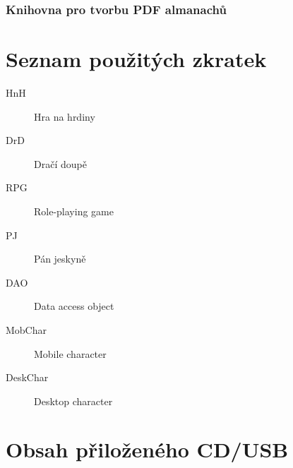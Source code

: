 \documentclass[thesis=B,czech]{resources/FITthesis}[2012/06/26]
\begin{document}
\subsection{Knihovna pro tvorbu PDF almanachů}

\begin{conclusion}
\end{conclusion}




\appendix

\chapter{Seznam použitých zkratek}
\begin{description}
	\item[HnH] Hra na hrdiny
	\item[DrD] Dračí doupě
	\item[RPG] Role-playing game
	\item[PJ] Pán jeskyně
	\item[DAO] Data access object
	\item[MobChar] Mobile character
	\item[DeskChar] Desktop character	
\end{description}

 

\chapter{Obsah přiloženého CD/USB}


\begin{figure}
\end{figure}
\end{document}
